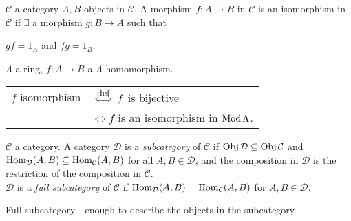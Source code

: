 \begin{defin}
$\mathcal{C}$ a category $A,B$ objects in $\mathcal{C}$. A morphism $f\colon A\to B$ in $\mathcal{C}$ is an isomorphism in $\mathcal{C}$ if $\exists$ a morphism $g\colon B\to A$ such that\\
\centerline{$gf = 1_A$ and $fg=1_B$.}
\end{defin}
\begin{note}
$\Lambda$ a ring, $f\colon A\to B$ a $\Lambda$-homomorphism.\\
\begin{tabular}{cl}
$f$ isomorphism & $\stackrel{\mathclap{\normalfont\mbox{def}}}{\iff} f$ is bijective\\
& $\iff f$ is an isomorphism in $\operatorname{Mod}\Lambda$. 
\end{tabular}
\end{note}


\begin{defin}
$\mathcal{C}$ a category. A category $\mathcal{D}$ is a \emph{subcategory} of $\mathcal{C}$ if $\operatorname{Obj}\mathcal{D} \subseteq \operatorname{Obj}\mathcal{C}$ and $\operatorname{Hom}_\mathcal{D}(A,B) \subseteq \operatorname{Hom}_\mathcal{C}(A,B)$ for all $A,B \in \mathcal{D}$, and the composition in $\mathcal{D}$ is the restriction of the composition in $\mathcal{C}$.\\
$\mathcal{D}$ is a \emph{full subcategory} of $\mathcal{C}$ if $\operatorname{Hom}_\mathcal{D}(A,B) = \operatorname{Hom}_\mathcal{C}(A,B)$ for $A,B \in \mathcal{D}$.
\end{defin}
\begin{note}
Full subcategory - enough to describe the objects in the subcategory.
\end{note}

